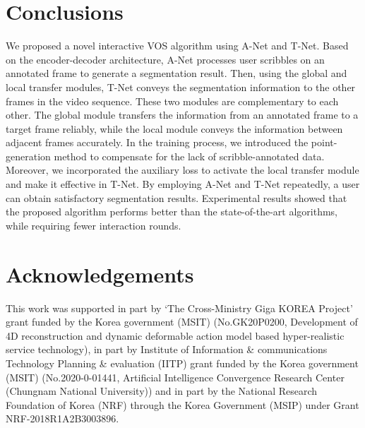 \documentclass[runningheads]{llncs}
\begin{document}
\section{Conclusions} \label{sec5:conclusion}

We proposed a novel interactive VOS algorithm using A-Net and T-Net. Based on the encoder-decoder architecture, A-Net processes user scribbles on an annotated frame to generate a segmentation result. Then, using the global and local transfer modules, T-Net conveys the segmentation information to the other frames in the video sequence. These two modules are complementary to each other. The global module transfers the information from an annotated frame to a target frame reliably, while the local module conveys the information between adjacent frames accurately. In the training process, we introduced the point-generation method to compensate for the lack of scribble-annotated data. Moreover, we incorporated the auxiliary loss to activate the local transfer module and make it effective in T-Net. By employing A-Net and T-Net repeatedly, a user can obtain satisfactory segmentation results. Experimental results showed that the proposed algorithm performs better than the state-of-the-art algorithms, while requiring fewer interaction rounds.

\section*{Acknowledgements}

This work was supported in part by `The Cross-Ministry Giga KOREA Project' grant funded by the Korea government (MSIT) (No.GK20P0200, Development of 4D reconstruction and dynamic deformable action model based hyper-realistic service technology), in part by Institute of Information \& communications Technology Planning \& evaluation (IITP) grant funded by the Korea government (MSIT) (No.2020-0-01441, Artificial Intelligence Convergence Research Center (Chungnam National University)) and in part by the National Research Foundation of Korea (NRF) through the Korea Government (MSIP) under Grant NRF-2018R1A2B3003896.



\end{document}
